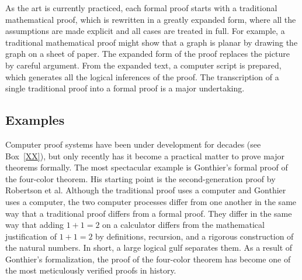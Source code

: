 \documentclass{llncs}
\begin{document}
As the art is currently practiced, each formal proof starts with a traditional
mathematical proof, which is rewritten in a greatly expanded form, where all the
assumptions are made explicit and all cases are treated in full.
For example, a traditional mathematical proof might show that a graph is
planar by drawing the graph on a sheet of paper.  The expanded form of
the proof  replaces the picture by careful argument.  From the
expanded text, a computer script is prepared, which generates all
the logical inferences of the proof.  The transcription of a single traditional
proof into a formal proof is a major undertaking.

\bigskip
\noindent
{}
\bigskip

\subsection{Examples}

Computer proof systems have been under development for decades (see Box~\ref{XX}), 
but only recently
has it become a practical matter to prove major theorems formally.
The most spectacular
example is Gonthier's formal proof of the four-color theorem.  His
starting point is the second-generation 
proof by Robertson et al.  Although the traditional proof uses a computer
and Gonthier uses a computer,  the two computer processes
differ from one another in the same way that a traditional proof differs
from a formal proof.  They differ in the same way that adding $1+1=2$ on
a calculator differs from the mathematical
justification of $1+1=2$ by definitions,
recursion, and a rigorous construction of the natural numbers.  
In short, a large logical gulf separates them.
As a result of Gonthier's formalization,
the proof of the four-color theorem has become one of the most meticulously verified proofs
in history.
\end{document}

